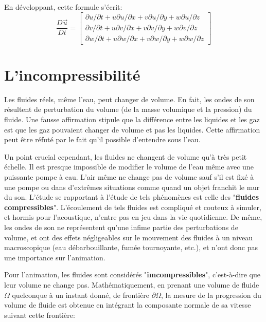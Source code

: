 \documentclass[11pt]{report}
\begin{document}
En développant, cette formule s'écrit:
\[
\frac{D\overrightarrow{u}}{Dt} = 
  \left[
	\begin{array}{c}
		\partial u/\partial t + u \partial u / \partial x + v \partial u / \partial y + w \partial u / \partial z \\
		\partial v/\partial t + u \partial v / \partial x + v \partial v / \partial y + w \partial v / \partial z\\
		\partial w/\partial t + u \partial w / \partial x + v \partial w / \partial y + w \partial w / \partial z
	\end{array}
 \right]
\]

\section{L'incompressibilité}

Les fluides réels, même l'eau, peut changer de volume. En fait, les ondes de son résultent de perturbation du volume (de la masse volumique et la pression) du fluide. Une fausse affirmation stipule que la différence entre les liquides et les gaz est que les gaz pouvaient changer de volume et pas les liquides. Cette affirmation peut être réfuté par le fait qu'il possible d'entendre sous l'eau.

Un point crucial cependant, les fluides ne changent de volume qu'à très petit échelle. Il est presque impossible de modifier le volume de l'eau même avec une puissante pompe à eau. L'air même ne change pas de volume sauf s'il est fixé à une pompe ou dans d'extrêmes situations comme quand un objet franchit le mur du son. L'étude se rapportant à l'étude de tels phénomènes est celle des "\textbf{fluides compressibles}". L'écoulement de tels fluides est compliqué et couteux à simuler, et hormis pour l'acoustique, n'entre pas en jeu dans la vie quotidienne. De même, les ondes de son ne représentent qu'une infime partie des perturbations de volume, et ont des effets négligeables sur le mouvement des fluides à un niveau macroscopique (eau débarbouillante, fumée tournoyante, etc.), et n'ont donc pas une importance sur l'animation.

Pour l'animation, les fluides sont considérés "\textbf{imcompressibles}", c'est-à-dire que leur volume ne change pas.
Mathématiquement, en prenant une volume de fluide $ \Omega $ quelconque à un instant donné, de frontière $ \partial\Omega $, la mesure de la progression du volume de fluide est obtenue en intégrant la composante normale de sa vitesse suivant cette frontière:
\end{document}

